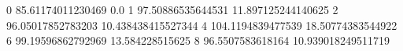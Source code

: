 0 85.61174011230469 0.0
1 97.50886535644531 11.897125244140625
2 96.05017852783203 10.438438415527344
4 104.1194839477539 18.50774383544922
6 99.19596862792969 13.584228515625
8 96.5507583618164 10.939018249511719
